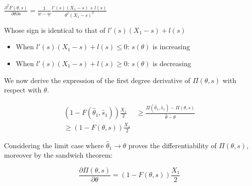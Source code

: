 \documentclass[a4paper]{article}
\renewcommand{\t}{\theta}
\begin{document}
$\frac{\partial^2 F(\t,s)}{\partial \t \partial s}=\frac{1}{\overline{w}-\underline{w}}\frac{l'(s)(X_1-s)+l(s)}{\t^2(X_1-s)^2}$

Whose sign is identical to that of $l'(s)(X_1-s)+l(s)$

\begin{itemize}
    \item When $l'(s)(X_1-s)+l(s)\leq 0$: $s(\t)$ is increasing 
    \item When $l'(s)(X_1-s)+l(s)\geq 0$: $s(\t)$ is decreasing 
\end{itemize}

We now derive the expression of the first degree derivative of $\Pi(\t,s)$ with respect with $\t$.


\begin{equation}
    \begin{aligned}
    (1-F(\hat{\t}_1,\hat{s}_1))\frac{X_1}{2} &\geq \frac{\Pi(\hat{\t}_1,\hat{s}_1)-\Pi(\t,s)}{\hat{\t}-\t}
    \\
    \geq (1-F(\t,s))\frac{X_1}{2}
    \end{aligned}
\end{equation}

Considering the limit case where $\hat{\t}_1\rightarrow \t$ proves the differentiability of $\Pi(\t,s)$, moreover by the sandwich theorem:


$$\frac{\partial \Pi(\t,s)}{\partial \t}=(1-F(\t,s))\frac{X_1}{2}$$







\end{document}
